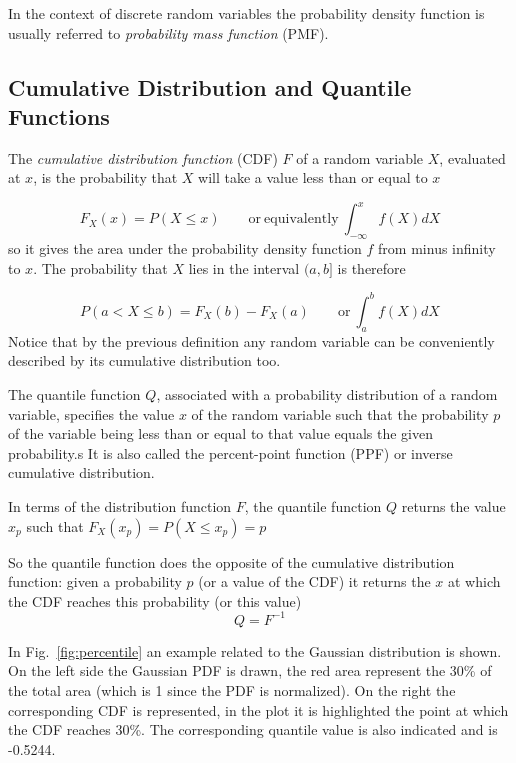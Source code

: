 In the context of discrete random variables the probability density function is usually referred to \emph{probability mass function} (PMF).

\subsection{Cumulative Distribution and Quantile Functions}\label{quantile-function}

The \emph{cumulative distribution function} (CDF) \(F\) of a random variable \(X\), 
evaluated at \(x\), is the probability that \(X\) will take a value less than or equal to \(x\)

\begin{equation}
	F_X(x) = P(X \le x)\qquad\mathrm{or~equivalently}~\int_{-\infty}^{x}{f(X)dX}
\end{equation}
so it gives the area under the probability density function \(f\) from
minus infinity to \(x\).
The probability that \(X\) lies in the interval \((a,b]\) is therefore

\begin{equation}
	P(a\lt X \le b)=F_{X}(b)-F_{X}(a)\qquad\mathrm{or}~\int_a^b{f(X)dX}
\end{equation}
Notice that by the previous definition any random variable can be conveniently described by its cumulative distribution too.

The quantile function $Q$, associated with a probability distribution of a random variable, 
specifies the value $x$ of the random variable such that the probability $p$ of the 
variable being less than or equal to that value equals the given probability.s 
It is also called the percent-point function (PPF) or inverse cumulative distribution.

In terms of the distribution function \(F\), the quantile function \(Q\)
returns the value \(x_p\) such that $F_{X}(x_p)=P(X\le x_p)=p$

So the quantile function does the opposite of the cumulative
distribution function: given a probability \(p\) (or a value of the CDF)
it returns the \(x\) at which the CDF reaches this probability (or this
value) 
\begin{equation}
	Q=F^{-1}
\end{equation}

In Fig.~\ref{fig:percentile} an example related to the
Gaussian distribution is shown. On the left side the Gaussian PDF is drawn,
the red area represent the 30\% of the total area (which is 1 since the
PDF is normalized). On the right the corresponding CDF is represented,
in the plot it is highlighted the point at which the CDF reaches
30\%. The corresponding quantile value is also indicated and is -0.5244.

